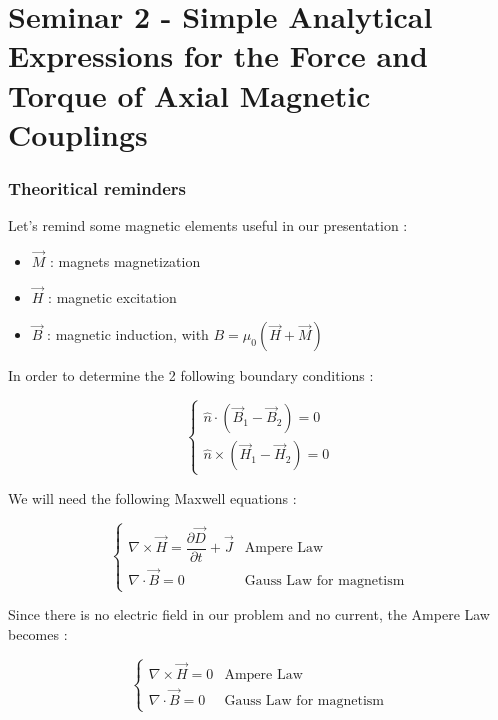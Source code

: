 \part{Seminar 2 - Simple Analytical Expressions for the Force and Torque of Axial Magnetic Couplings}


\section{Theoritical reminders}


Let's remind some magnetic elements useful in our presentation : 

\begin{itemize}
    \item $\vec{M}$ : magnets magnetization
    \item $\vec{H}$ : magnetic excitation
      \item $\vec{B}$ : magnetic induction, with $B = \mu_0(\vec{H}+\vec{M})$
    
\end{itemize}


In order to determine the 2 following boundary conditions : 


\begin{equation*}
\left\{
    \begin{array}{l}
    \hat{n}\cdot(\vec{B}_1 - \vec{B}_2) = 0 
       \\
        \hat{n}\times (\vec{H}_1 - \vec{H}_2) = 0 
    \end{array}
\right.    
\end{equation*}

We will need the following Maxwell equations : 

\begin{equation*}
\left\{
    \begin{array}{ll}
     \nabla \times \vec{H} = \dfrac{\partial \vec{D}}{\partial t} + \vec{J} & \text{Ampere Law}
       \\
         \nabla \cdot \vec{B} = 0 & \text{Gauss Law for magnetism}
    \end{array}
\right.
\end{equation*}

Since there is no electric field in our problem and no current, the Ampere Law becomes : 

\begin{equation*}
\left\{
    \begin{array}{ll}
     \nabla \times \vec{H} =0 & \text{Ampere Law}
       \\
         \nabla \cdot \vec{B} = 0 & \text{Gauss Law for magnetism}
    \end{array}
\right.    
\end{equation*}

